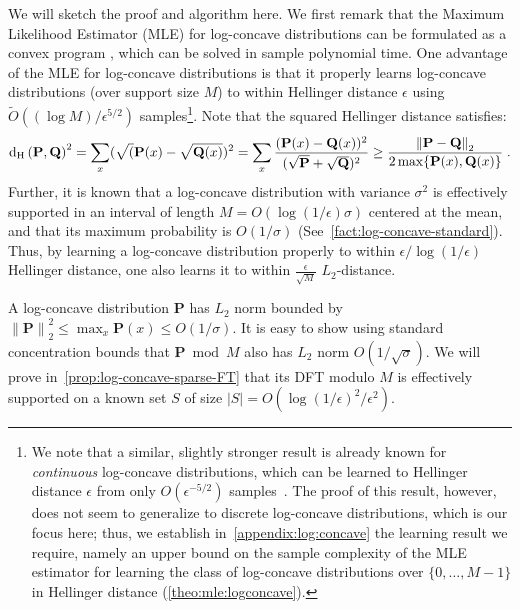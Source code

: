 \documentclass[11pt]{article}
\theoremstyle{definition}
\newcommand{\p}{\mathbf{P}}
\newcommand{\q}{\mathbf{Q}}
\newcommand{\eps}{\epsilon}
\newcommand{\norm}[1]{\lVert#1\rVert}
\newcommand{\normtwo}[1]{{\norm{#1}}_2}
\newcommand{\tildeO}[1]{\tilde{O}\left( #1 \right)}
\newcommand{\hellinger}[2]{{\operatorname{d_{\rm{}H}}\left({#1, #2}\right)}}
\begin{document}
We will sketch the proof and algorithm here. We first remark that the Maximum Likelihood Estimator (MLE) for log-concave distributions can be formulated as a convex program \cite{DR11}, 
which can be solved in sample polynomial time. One advantage of the MLE for log-concave distributions is that it properly learns log-concave distributions (over support size $M$) 
to within Hellinger distance $\eps$ using $\tildeO{(\log M)/\eps^{5/2}}$ samples\footnote{We note that a similar, slightly stronger result is already known for \emph{continuous} log-concave distributions, which can be learned to Hellinger distance $\eps$ from only $O(\eps^{-5/2})$ samples~\cite{KS:16}. The proof of this result, however, does not seem to generalize to discrete log-concave distributions, which is our focus here; thus, we establish in~\cref{appendix:log:concave} the learning result we require, namely an upper bound on the sample complexity of the MLE estimator for learning the class of log-concave distributions over $\{0,\dots,M-1\}$ in Hellinger distance (\cref{theo:mle:logconcave}).}. Note that the squared Hellinger distance satisfies:
\[
\hellinger{\p}{\q}^2 = \sum_x (\sqrt(\p(x)-\sqrt{\q(x)})^2 = \sum_x \frac{(\p(x)-\q(x))^2}{(\sqrt{\p} +\sqrt{\q})^2} \geq \frac{\normtwo{\p-\q}}{2\max\{\p(x),\q(x)\}} \;.
\]
Further, it is known that a log-concave distribution with variance $\sigma^2$ is effectively supported in an interval of length $M=O(\log(1/\eps) \sigma)$ centered at the mean, 
and that its maximum probability is $O(1/\sigma)$ (See~\cref{fact:log-concave-standard}). Thus, by learning a log-concave distribution properly to within $\eps/\log(1/\eps)$ Hellinger distance, one also learns it to within $\frac{\eps}{\sqrt{M}}$ $L_2$-distance.

A log-concave distribution $\p$ has $L_2$ norm bounded by $\normtwo{\p}^2 \leq \max_x \p(x) \leq O(1/\sigma)$. 
It is easy to show using standard concentration bounds that $\p \bmod M$ also has $L_2$ norm $O(1/\sqrt{\sigma})$. 
We will prove in~\cref{prop:log-concave-sparse-FT} that its DFT modulo $M$ is effectively 
supported on a known set $S$ of size $|S|=O(\log(1/\eps)^2/\eps^2)$.
\end{document}
